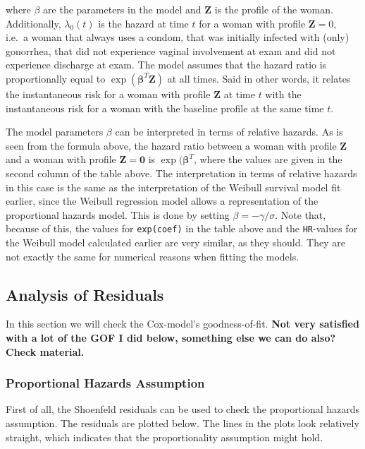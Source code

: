 \documentclass[
]{article}
\begin{document}
where \(\beta\) are the parameters in the model and \(\mathbf{Z}\) is the profile of the woman. Additionally, \(\lambda_0(t)\) is the hazard at time \(t\) for a woman with profile \(\mathbf{Z} = 0\), i.e.~a woman that always uses a condom, that was initially infected with (only) gonorrhea, that did not experience vaginal involvement at exam and did not experience discharge at exam. The model assumes that the hazard ratio is proportionally equal to \(\exp(\mathbf{\beta}^T\mathbf{Z})\) at all times. Said in other words, it relates the instantaneous risk for a woman with profile \(\mathbf{Z}\) at time \(t\) with the instantaneous risk for a woman with the baseline profile at the same time \(t\).

The model parameters \(\beta\) can be interpreted in terms of relative hazards. As is seen from the formula above, the hazard ratio between a woman with profile \(\mathbf{Z}\) and a woman with profile \(\mathbf{Z} = \mathbf{0}\) is \(\exp(\mathbf{\beta}^T\), where the values are given in the second column of the table above. The interpretation in terms of relative hazards in this case is the same as the interpretation of the Weibull survival model fit earlier, since the Weibull regression model allows a representation of the proportional hazards model. This is done by setting \(\beta = -\gamma/\sigma\). Note that, because of this, the values for \texttt{exp(coef)} in the table above and the \texttt{HR}-values for the Weibull model calculated earlier are very similar, as they should. They are not exactly the same for numerical reasons when fitting the models.

\hypertarget{analysis-of-residuals}{%
\subsection{Analysis of Residuals}\label{analysis-of-residuals}}

In this section we will check the Cox-model's goodness-of-fit. \textbf{Not very satisfied with a lot of the GOF I did below, something else we can do also? Check material.}

\hypertarget{proportional-hazards-assumption}{%
\subsubsection{Proportional Hazards Assumption}\label{proportional-hazards-assumption}}

First of all, the Shoenfeld residuals can be used to check the proportional hazards assumption. The residuals are plotted below. The lines in the plots look relatively straight, which indicates that the proportionality assumption might hold.
\end{document}
